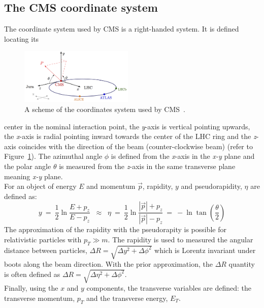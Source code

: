\subsection{The CMS coordinate system} 
The coordinate system used by CMS is a right-handed system. It is defined
locating its 
\begin{figure}
  \begin{center}
    \includegraphics[clip,trim=0cm 0cm 0cm 0.1cm, width=0.48\textwidth]{Figures/c2/cms_coordinate_system.png}
  \end{center}
  \caption{A scheme of the coordinates system used by CMS~\cite{coordinate_cms}.}
\label{fig:coordinates}
\end{figure}
 center in the nominal interaction point, the
\emph{y}-axis is vertical pointing upwards, the \emph{x}-axis is
radial pointing inward towards the center of the LHC ring and the
\emph{z}-axis coincides with the direction of the beam
(counter-clockwise beam) (refer to
Figure~\ref{fig:coordinates}). The azimuthal angle $\phi$ is defined
from the \emph{x}-axis in the \emph{x-y} plane and the polar angle
$\theta$ is measured from the \emph{z}-axis in the same transverse
plane meaning \emph{x-y} plane.\\
For an object of energy $E$ and momentum $\overrightarrow{p}$,
rapidity, $y$ and pseudorapidity, $\eta$ are defined as:
\begin{equation}
\label{eq:pseudo}
y \: = \: \frac{1}{2} \ln \frac{E + p_z}{E - p_z} \;\; \approx \;\;
\eta \: = \: \frac{1}{2} \ln \frac{|\overrightarrow{p}| +
  p_z}{|\overrightarrow{p}| - p_z} \: = \: -\ln \tan (\frac{\theta}{2})
\end{equation}
The approximation of the rapidity with the pseudorapity is possible for
relativistic particles with $p_{T} \gg m$. The rapidity is used to
measured the angular distance between particles, $\Delta R =
\sqrt{\Delta y ^2 + \Delta \phi ^2}$ which is Lorentz invariant under
boots along the beam direction. With the prior approximation,
the $\Delta R$ quantity is often defined as $\Delta R =
\sqrt{\Delta \eta ^2 + \Delta \phi ^2}$.\\
Finally, using the $x$ and $y$ components, the transverse variables
are defined: the transverse momentum, $p_T$ and the transverse energy,
$E_T$.\\

